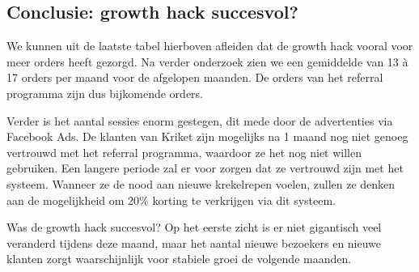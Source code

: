 \subsection{Conclusie: growth hack succesvol?} \label{sec:conclusie-growth-hack-succesvol}
We kunnen uit de laatste tabel hierboven afleiden dat de growth hack vooral voor meer orders heeft gezorgd. Na verder onderzoek zien we een gemiddelde van 13 à 17 orders per maand voor de afgelopen maanden. De orders van het referral programma zijn dus bijkomende orders.

Verder is het aantal sessies enorm gestegen, dit mede door de advertenties via Facebook Ads. De klanten van Kriket zijn mogelijks na 1 maand nog niet genoeg vertrouwd met het referral programma, waardoor ze het nog niet willen gebruiken. Een langere periode zal er voor zorgen dat ze vertrouwd zijn met het systeem. Wanneer ze de nood aan nieuwe krekelrepen voelen, zullen ze denken aan de mogelijkheid om 20\% korting te verkrijgen via dit systeem.

Was de growth hack succesvol? Op het eerste zicht is er niet gigantisch veel veranderd tijdens deze maand, maar het aantal nieuwe bezoekers en nieuwe klanten zorgt waarschijnlijk voor stabiele groei de volgende maanden. 

